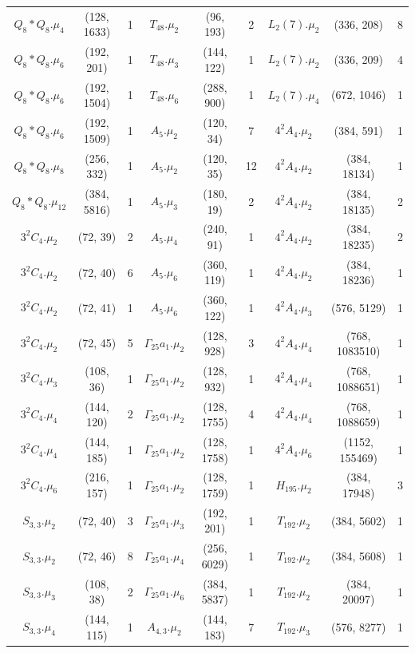 {\begin{longtable}{ccc|ccc|ccc}
\rowcolor{lightgray}
$Q_8 * Q_8.\mu_{4}$&(128, 1633)&1 & $T_{48}.\mu_{2}$&(96, 193)&2 & $L_2(7).\mu_{2}$&(336, 208)&8\\
$Q_8 * Q_8.\mu_{6}$&(192, 201)&1 & $T_{48}.\mu_{3}$&(144, 122)&1 & $L_2(7).\mu_{2}$&(336, 209)&4\\
\rowcolor{lightgray}
$Q_8 * Q_8.\mu_{6}$&(192, 1504)&1 & $T_{48}.\mu_{6}$&(288, 900)&1 & $L_2(7).\mu_{4}$&(672, 1046)&1\\
$Q_8 * Q_8.\mu_{6}$&(192, 1509)&1 & $A_5.\mu_{2}$&(120, 34)&7 & $4^2A_4.\mu_{2}$&(384, 591)&1\\
\rowcolor{lightgray}
$Q_8 * Q_8.\mu_{8}$&(256, 332)&1 & $A_5.\mu_{2}$&(120, 35)&12 & $4^2A_4.\mu_{2}$&(384, 18134)&1\\
$Q_8 * Q_8.\mu_{12}$&(384, 5816)&1 & $A_5.\mu_{3}$&(180, 19)&2 & $4^2A_4.\mu_{2}$&(384, 18135)&2\\
\rowcolor{lightgray}
$3^2C_4.\mu_{2}$&(72, 39)&2 & $A_5.\mu_{4}$&(240, 91)&1 & $4^2A_4.\mu_{2}$&(384, 18235)&2\\
$3^2C_4.\mu_{2}$&(72, 40)&6 & $A_5.\mu_{6}$&(360, 119)&1 & $4^2A_4.\mu_{2}$&(384, 18236)&1\\
\rowcolor{lightgray}
$3^2C_4.\mu_{2}$&(72, 41)&1 & $A_5.\mu_{6}$&(360, 122)&1 & $4^2A_4.\mu_{3}$&(576, 5129)&1\\
$3^2C_4.\mu_{2}$&(72, 45)&5 & $\Gamma_{25}a_1.\mu_{2}$&(128, 928)&3 & $4^2A_4.\mu_{4}$&(768, 1083510)&1\\
\rowcolor{lightgray}
$3^2C_4.\mu_{3}$&(108, 36)&1 & $\Gamma_{25}a_1.\mu_{2}$&(128, 932)&1 & $4^2A_4.\mu_{4}$&(768, 1088651)&1\\
$3^2C_4.\mu_{4}$&(144, 120)&2 & $\Gamma_{25}a_1.\mu_{2}$&(128, 1755)&4 & $4^2A_4.\mu_{4}$&(768, 1088659)&1\\
\rowcolor{lightgray}
$3^2C_4.\mu_{4}$&(144, 185)&1 & $\Gamma_{25}a_1.\mu_{2}$&(128, 1758)&1 & $4^2A_4.\mu_{6}$&(1152, 155469)&1\\
$3^2C_4.\mu_{6}$&(216, 157)&1 & $\Gamma_{25}a_1.\mu_{2}$&(128, 1759)&1 & $H_{195}.\mu_{2}$&(384, 17948)&3\\
\rowcolor{lightgray}
$S_{3,3}.\mu_{2}$&(72, 40)&3 & $\Gamma_{25}a_1.\mu_{3}$&(192, 201)&1 & $T_{192}.\mu_{2}$&(384, 5602)&1\\
$S_{3,3}.\mu_{2}$&(72, 46)&8 & $\Gamma_{25}a_1.\mu_{4}$&(256, 6029)&1 & $T_{192}.\mu_{2}$&(384, 5608)&1\\
\rowcolor{lightgray}
$S_{3,3}.\mu_{3}$&(108, 38)&2 & $\Gamma_{25}a_1.\mu_{6}$&(384, 5837)&1 & $T_{192}.\mu_{2}$&(384, 20097)&1\\
$S_{3,3}.\mu_{4}$&(144, 115)&1 & $A_{4,3}.\mu_{2}$&(144, 183)&7 & $T_{192}.\mu_{3}$&(576, 8277)&1\\

\end{longtable}}

